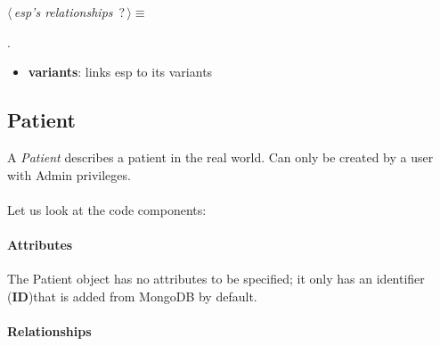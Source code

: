 	\begin{flushleft} \small
\begin{minipage}{\linewidth}\label{scrap13}\raggedright\small
{} $\langle\,${\itshape {esp's relationships}}\nobreak\ {\footnotesize {?}}$\,\rangle\equiv$
\vspace{-1ex}
\begin{list}{}{} \item

                
        {\NWsep}
\end{list}
\vspace{-1.5ex}
\footnotesize
\begin{list}{}{\setlength{\itemsep}{-\parsep}\setlength{\itemindent}{-\leftmargin}}
\item {\NWtxtMacroNoRef}.

\item{}
\end{list}
\end{minipage}\vspace{4ex}
\end{flushleft}
\begin{itemize}
 	\item \textbf{variants}: links esp to its variants
\end{itemize}


\subsection{Patient}
A \emph{Patient} describes a patient in the real world. Can only be created by a user with Admin privileges.
\\
\\Let us look at the code components:

\paragraph{Attributes}      

The Patient object has no attributes to be specified; it only has an identifier (\textbf{ID})that is added from MongoDB by default.

\newpage

\paragraph{Relationships} 

